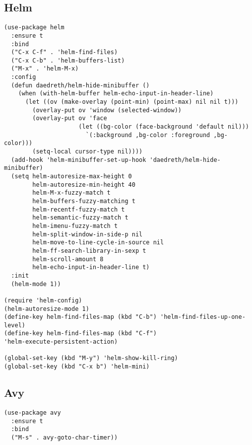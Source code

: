 \documentclass[12pt]{article}
\begin{document}
\subsection{Helm}
\label{sec:org08a78aa}

\begin{verbatim}
(use-package helm
  :ensure t
  :bind
  ("C-x C-f" . 'helm-find-files)
  ("C-x C-b" . 'helm-buffers-list)
  ("M-x" . 'helm-M-x)
  :config
  (defun daedreth/helm-hide-minibuffer ()
    (when (with-helm-buffer helm-echo-input-in-header-line)
      (let ((ov (make-overlay (point-min) (point-max) nil nil t)))
        (overlay-put ov 'window (selected-window))
        (overlay-put ov 'face
                     (let ((bg-color (face-background 'default nil)))
                       `(:background ,bg-color :foreground ,bg-color)))
        (setq-local cursor-type nil))))
  (add-hook 'helm-minibuffer-set-up-hook 'daedreth/helm-hide-minibuffer)
  (setq helm-autoresize-max-height 0
        helm-autoresize-min-height 40
        helm-M-x-fuzzy-match t
        helm-buffers-fuzzy-matching t
        helm-recentf-fuzzy-match t
        helm-semantic-fuzzy-match t
        helm-imenu-fuzzy-match t
        helm-split-window-in-side-p nil
        helm-move-to-line-cycle-in-source nil
        helm-ff-search-library-in-sexp t
        helm-scroll-amount 8 
        helm-echo-input-in-header-line t)
  :init
  (helm-mode 1))

(require 'helm-config)    
(helm-autoresize-mode 1)
(define-key helm-find-files-map (kbd "C-b") 'helm-find-files-up-one-level)
(define-key helm-find-files-map (kbd "C-f")
'helm-execute-persistent-action)

(global-set-key (kbd "M-y") 'helm-show-kill-ring)
(global-set-key (kbd "C-x b") 'helm-mini)

\end{verbatim}


\subsection{Avy}
\label{sec:org9a77ebf}

\begin{verbatim}
(use-package avy
  :ensure t
  :bind
  ("M-s" . avy-goto-char-timer))
\end{verbatim}
\end{document}
